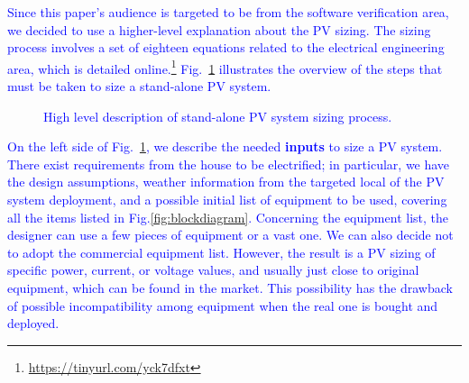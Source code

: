 \documentclass[runningheads]{llncs}
\begin{document}
\textcolor{blue}{Since this paper's audience is targeted to be from the software verification area, we decided to use a higher-level explanation about the PV sizing. The sizing process involves a set of eighteen equations related to the electrical engineering area, which is detailed online.\footnote{\url{https://tinyurl.com/yck7dfxt}} Fig.~\ref{fig:flow} illustrates the overview of the steps that must be taken to size a stand-alone PV system.}
%
\begin{figure}[h]
\centering
\caption{\textcolor{blue}{High level description of stand-alone PV system sizing process.}}
\label{fig:flow} 
\end{figure}

\textcolor{blue}{On the left side of Fig.~\ref{fig:flow}, we describe the needed \textbf{inputs} to size a PV system. There exist requirements from the house to be electrified; in particular, we have the design assumptions, weather information from the targeted local of the PV system deployment, and a possible initial list of equipment to be used, covering all the items listed in Fig.\ref{fig:blockdiagram}. Concerning the equipment list, the designer can use a few pieces of equipment or a vast one. We can also decide not to adopt the commercial equipment list. However, the result is a PV sizing of specific power, current, or voltage values, and usually just close to original equipment, which can be found in the market. This possibility has the drawback of possible incompatibility among equipment when the real one is bought and deployed.}
\end{document}
